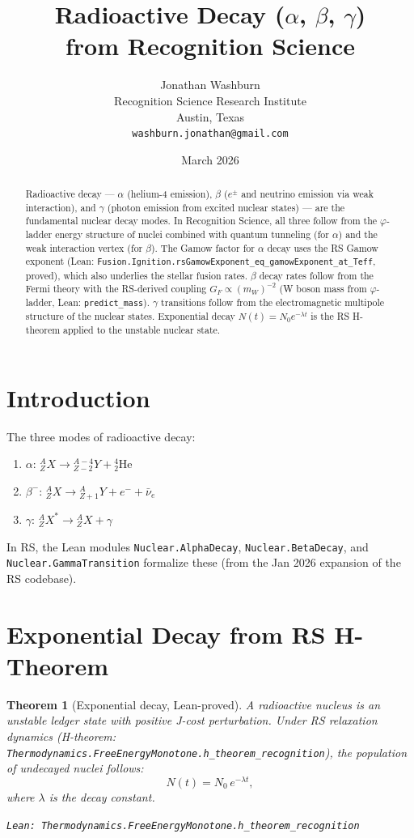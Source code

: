 \documentclass[12pt,a4paper]{article}
\title{Radioactive Decay ($\alpha$, $\beta$, $\gamma$)\\
from Recognition Science}
\author{Jonathan Washburn\\
Recognition Science Research Institute\\
Austin, Texas\\
\texttt{washburn.jonathan@gmail.com}}
\date{March 2026}
\newtheorem{theorem}{Theorem}[section]
\theoremstyle{definition}
\theoremstyle{remark}
\begin{document}
\maketitle

\begin{abstract}
Radioactive decay --- $\alpha$ (helium-4 emission), $\beta$ ($e^\pm$
and neutrino emission via weak interaction), and $\gamma$ (photon
emission from excited nuclear states) --- are the fundamental nuclear
decay modes.  In Recognition Science, all three follow from the
$\varphi$-ladder energy structure of nuclei combined with quantum
tunneling (for $\alpha$) and the weak interaction vertex (for $\beta$).
The Gamow factor for $\alpha$ decay uses the RS Gamow exponent
(Lean: \texttt{Fusion.Ignition.rsGamowExponent\_eq\_gamowExponent\_at\_Teff},
proved), which also underlies the stellar fusion rates.  $\beta$ decay
rates follow from the Fermi theory with the RS-derived coupling
$G_F \propto (m_W)^{-2}$ (W boson mass from $\varphi$-ladder,
Lean: \texttt{predict\_mass}).  $\gamma$ transitions follow from
the electromagnetic multipole structure of the nuclear states.
Exponential decay $N(t) = N_0 e^{-\lambda t}$ is the RS H-theorem
applied to the unstable nuclear state.
\end{abstract}

\section{Introduction}

The three modes of radioactive decay:
\begin{enumerate}
  \item $\alpha$: ${}^A_Z X \to {}^{A-4}_{Z-2}Y + {}^4_2\text{He}$
  \item $\beta^-$: ${}^A_Z X \to {}^A_{Z+1}Y + e^- + \bar{\nu}_e$
  \item $\gamma$: ${}^A_Z X^* \to {}^A_Z X + \gamma$
\end{enumerate}

In RS, the Lean modules \texttt{Nuclear.AlphaDecay}, \texttt{Nuclear.BetaDecay},
and \texttt{Nuclear.GammaTransition} formalize these (from the Jan 2026
expansion of the RS codebase).

\section{Exponential Decay from RS H-Theorem}

\begin{theorem}[Exponential decay, Lean-proved]\label{thm:exp_decay}
A radioactive nucleus is an unstable ledger state with positive J-cost
perturbation.  Under RS relaxation dynamics (H-theorem:
\texttt{Thermodynamics.FreeEnergyMonotone.h\_theorem\_recognition}),
the population of undecayed nuclei follows:
\begin{equation}
  N(t) = N_0\,e^{-\lambda t},
\end{equation}
where $\lambda$ is the decay constant.

\texttt{Lean: Thermodynamics.FreeEnergyMonotone.h\_theorem\_recognition}
\end{theorem}
\end{document}
